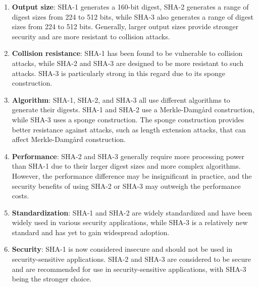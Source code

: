 \documentclass[openany]{book}
\begin{document}
\begin{enumerate}
\begin{enumerate}
          \end{enumerate}

          \begin{enumerate}
              \item \textbf{Output size}: SHA-1 generates a 160-bit digest, SHA-2 generates a range of digest sizes from 224 to 512 bits, while SHA-3 also generates a range of digest sizes from 224 to 512 bits. Generally, larger output sizes provide stronger security and are more resistant to collision attacks.

              \item \textbf{Collision resistance}: SHA-1 has been found to be vulnerable to collision attacks, while SHA-2 and SHA-3 are designed to be more resistant to such attacks. SHA-3 is particularly strong in this regard due to its sponge construction.

              \item \textbf{Algorithm}: SHA-1, SHA-2, and SHA-3 all use different algorithms to generate their digests. SHA-1 and SHA-2 use a Merkle-Damgård construction, while SHA-3 uses a sponge construction. The sponge construction provides better resistance against attacks, such as length extension attacks, that can affect Merkle-Damgård construction.

              \item \textbf{Performance}: SHA-2 and SHA-3 generally require more processing power than SHA-1 due to their larger digest sizes and more complex algorithms. However, the performance difference may be insignificant in practice, and the security benefits of using SHA-2 or SHA-3 may outweigh the performance costs.

              \item \textbf{Standardization}: SHA-1 and SHA-2 are widely standardized and have been widely used in various security applications, while SHA-3 is a relatively new standard and has yet to gain widespread adoption.

              \item \textbf{Security}: SHA-1 is now considered insecure and should not be used in security-sensitive applications. SHA-2 and SHA-3 are considered to be secure and are recommended for use in security-sensitive applications, with SHA-3 being the stronger choice.
          \end{enumerate}


\end{enumerate}
\end{document}
